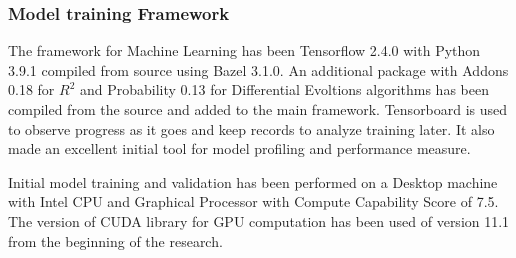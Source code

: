 \subsubsection{Model training Framework}
The framework for Machine Learning has been Tensorflow 2.4.0 with Python 3.9.1 compiled from source using Bazel 3.1.0.
An additional package with Addons 0.18 for $R^2$ and Probability 0.13 for Differential Evoltions algorithms has been compiled from the source and added to the main framework.
Tensorboard is used to observe progress as it goes and keep records to analyze training later. It also made an excellent initial tool for model profiling and performance measure.

%
%
Initial model training and validation has been performed on a Desktop machine with Intel CPU and Graphical Processor with Compute Capability Score of 7.5. The version of CUDA library for GPU computation has been used of version 11.1 from the beginning of the research.
%

